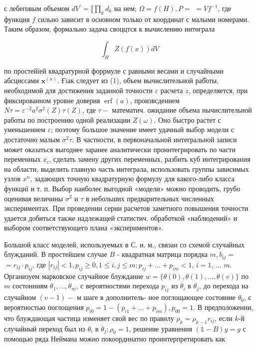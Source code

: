 \documentclass[10pt]{article}
\begin{document}
с лебеговым объемом $d V^{\prime}=\llbracket \prod_{k} d_{k}$ на нем; $\Omega=f(H), P=$ $=V f^{-1}$, где функция $f$ сильно зависит в основном только от координат с малыми номерами. Таким образом, формально задача своццтся к вычислению интөграла



\[

\int_{H} Z(f(x)) d V

\]



по простейїей квадратурной форрмуле с равными весами и случайными абсциссами $\boldsymbol{x}^{(n)}$. Ғiак следует из (1), объем вычислительной раб̆оты, необходимой для достижения заданной точности $\varepsilon$ расчета $z$, определяется, при фиксированном уровне доверия $\operatorname{erf}(a)$, произвсдением $N \tau=\varepsilon^{-2} a^{2} \sigma^{2}(Z) \tau(Z)$, где $\tau-$ математич. ожидание объема нычислительной работы по построению одной реализации $Z(\omega)$. Оно быстро растет с уменьшением $\varepsilon$; поэтому большое значение имеет удачный выбор модели с достаточно малым $\sigma^{2} \tau$. В частности, в первоначальной интегральной записи может оказаться выгоднее заранее аналитически проинтегрировать по части переменных $x_{i}$, сделать замену других переменных, разбить куб интегрирования на области, выделить главную часть интеграла, использовать группы зависимых узлов $x^{n}$, задающих точную квадратурную формулу для какого-либо класса функциї и т. п. Выбор наиболеє выгодной «модели» можно проводить, грубо оценивая величины $\sigma^{2}$ и $\tau$ в небольших предварительных численных экспериментах. При проведении серии расчетов заметного повышения точности удается добиться также надлежащей статистич. обработкой «наблюдений» и выбором соответствующего плана «экспериментов».



Большой класс моделей, используемых в С. и. м., связан со схемой случайных блужданий. В простейшем случае $B$ - квадратная матрица порядка $m, b_{i j}=$ $=r_{i j} \cdot p_{i j}$, где $\left|r_{i j}\right|<1, p_{i j} \geqslant 0,1 \leqslant i, j \leqslant m ; p_{i j}+\ldots+p_{i m}<1$, $i=1$, ... $m$. Организуем марковское случайное блуждание $w=\{\theta(0), \theta(1), \ldots, \theta(v)\}$ по $m$ состонниям $\theta_{1}, \ldots, \theta_{m}$, с вероятностями перехода $p_{i j}$ из $\theta_{i}$ в $\theta_{j}$, до перехода на случайном $(v-1)-$ м шаге в дополнитель- ное поглощающее состояние $\theta_{0}$, с вероятностью поглощения $p_{i 0}=1-\left(p_{i 1}+\ldots+p_{i m}\right), p_{00}=1$. В предположении, что блуждающая частица изменяет свой вес по правилу $\rho_{k}=\rho_{k-1} r_{i j}$, если $k$-й случайный переход был из $\theta_{i}$ в $\theta_{j} ; \rho_{0}=1$, решение уравнения $(\mathbb{1}-B) y=g$ с помощью ряда Неймана можно покоординатно проинтерпретировать как
\end{document}
